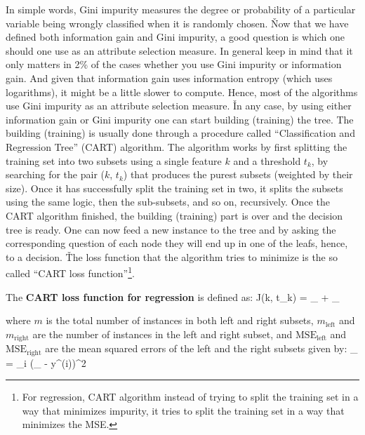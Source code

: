 In simple words, Gini impurity measures the degree or probability of a particular variable being wrongly classified
when it is randomly chosen.  \v

Now that we have defined both information gain and Gini impurity, a good question is which one should one use as an
attribute selection measure. In general keep in mind that it only matters in 2\% of the cases whether you use Gini
impurity or information gain. And given that information gain uses information entropy (which uses logarithms), it
might be a little slower to compute. Hence, most of the algorithms use Gini impurity as an attribute selection
measure. \v

In any case, by using either information gain or Gini impurity one can start building (training) the tree. The
building (training) is usually done through a procedure called ``Classification and Regression Tree'' (CART)
algorithm. The algorithm works by first splitting the training set into two subsets using a single feature $k$ and a
threshold $t_k$, by searching for the pair ($k$, $t_k$) that produces the purest subsets (weighted by their size).
Once it has successfully split the training set in two, it splits the subsets using the same logic, then the
sub-subsets, and so on, recursively. Once the CART algorithm finished, the building (training) part is over and the
decision tree is ready. One can now feed a new instance to the tree and by asking the corresponding question of each
node they will end up in one of the leafs, hence, to a decision. \v

The loss function that the algorithm tries to minimize is the so called ``CART loss function''\footnote{For regression,
CART algorithm instead of trying to split the training set in a way that minimizes impurity, it tries to split the
training set in a way that minimizes the MSE\@.}.

The \textbf{CART loss function for regression} is defined as:
\bse
J(k, t_{k}) =  _{} + _{}
\ese

where $m$ is the total number of instances in both left and right subsets, $m_{\text{left}}$ and $m_{\text{right}}$ are
the number of instances in the left and right subset, and $\text{MSE}_{\text{left}}$ and $\text{MSE}_{\text{right}}$ are
the mean squared errors of the left and the right subsets given by:
\bse
{}_{} = \sum_{i \in {}} ({}_ - y^{(i)})^2
\ese

